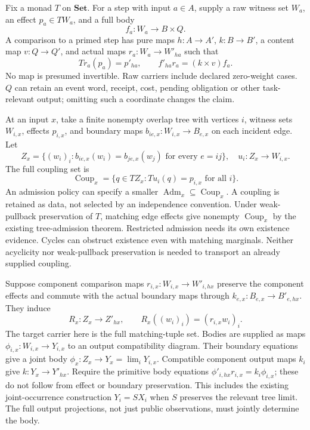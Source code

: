\documentclass[11pt]{article}
\newcommand{\Set}{\mathbf{Set}}
\newcommand{\Adm}{\operatorname{Adm}}
\newcommand{\Coup}{\operatorname{Coup}}
\begin{document}
Fix a monad $T$ on $\Set$. For a step with input $a\in A$, supply a raw witness set $W_a$, an effect $p_a\in TW_a$, and a full body
\[
 f_a:W_a\longrightarrow B\times Q.
\]
A comparison to a primed step has pure maps $h:A\to A'$, $k:B\to B'$, a content map $v:Q\to Q'$, and actual maps $r_a:W_a\to W'_{ha}$ such that
\[
 Tr_a(p_a)=p'_{ha},\qquad f'_{ha}r_a=(k\times v)f_a. \tag{N}\label{eq:native}
\]
No map is presumed invertible. Raw carriers include declared zero-weight cases. $Q$ can retain an event word, receipt, cost, pending obligation or other task-relevant output; omitting such a coordinate changes the claim.

At an input $x$, take a finite nonempty overlap tree with vertices $i$, witness sets $W_{i,x}$, effects $p_{i,x}$, and boundary maps $b_{ie,x}:W_{i,x}\to B_{e,x}$ on each incident edge. Let
\[
 Z_x=\{(w_i)_i: b_{ie,x}(w_i)=b_{je,x}(w_j)\text{ for every }e=ij\},
\quad u_i:Z_x\to W_{i,x}.
\]
The full coupling set is
\[
 \Coup_x=\{q\in TZ_x:Tu_i(q)=p_{i,x}\text{ for all }i\}. \tag{C}
\]
An admission policy can specify a smaller $\Adm_x\subseteq\Coup_x$. A coupling is retained as data, not selected by an independence convention. Under weak-pullback preservation of $T$, matching edge effects give nonempty $\Coup_x$ by the existing tree-admission theorem. Restricted admission needs its own existence evidence. Cycles can obstruct existence even with matching marginals. Neither acyclicity nor weak-pullback preservation is needed to transport an already supplied coupling.

Suppose component comparison maps $r_{i,x}:W_{i,x}\to W'_{i,hx}$ preserve the component effects and commute with the actual boundary maps through $k_{e,x}:B_{e,x}\to B'_{e,hx}$. They induce
\[
 R_x:Z_x\longrightarrow Z'_{hx},\qquad R_x((w_i)_i)=(r_{i,x}w_i)_i. \tag{R}
\]
The target carrier here is the full matching-tuple set. Bodies are supplied as maps $\phi_{i,x}:W_{i,x}\to Y_{i,x}$ to an output compatibility diagram. Their boundary equations give a joint body $\phi_x:Z_x\to Y_x=\lim_i Y_{i,x}$. Compatible component output maps $k_i$ give $k:Y_x\to Y'_{hx}$. Require the primitive body equations $\phi'_{i,hx}r_{i,x}=k_i\phi_{i,x}$; these do not follow from effect or boundary preservation. This includes the existing joint-occurrence construction $Y_i=SX_i$ when $S$ preserves the relevant tree limit. The full output projections, not just public observations, must jointly determine the body.
\end{document}
